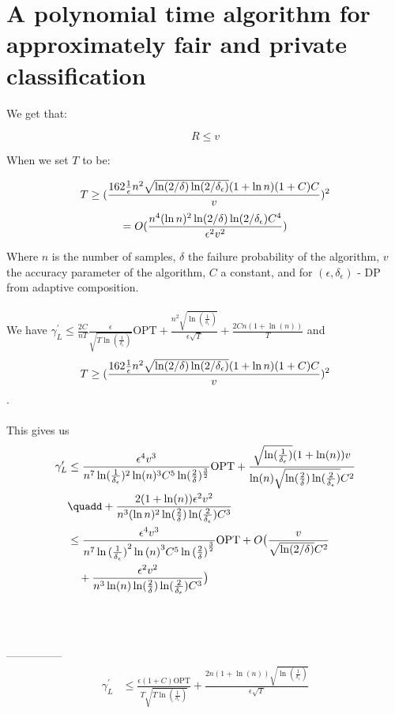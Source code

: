 
\section{A polynomial time algorithm for approximately fair and private classification}

We get that:

$$R \leq v$$

When we set $T$ to be:

$$T \geq (\frac{162\frac{1}{\epsilon}n^2 \sqrt{\ln(2/\delta) \ln(2/\delta_\epsilon)}(1+\ln n)(1+C)C}{v})^2$$
$$= O(\frac{n^4(\ln n)^2 \ln(2/\delta) \ln(2/\delta_\epsilon)C^4}{\epsilon^2 v^2})$$

Where $n$ is the number of samples, $\delta$ the failure probability of the algorithm,
$v$ the accuracy parameter of the algorithm, $C$ a constant, and for $(\epsilon, \delta_\epsilon)$ - DP from adaptive composition.
\\ \\
\newpage
We have $\gamma_L^\prime \leq \frac{2C}{nT}
\frac{\epsilon}
{\sqrt{T\ln{(
\frac{1}{\delta_{\epsilon}}
)}}} \text{OPT}
+
\frac{n^2
\sqrt{\ln{(\frac{1}{\delta_\epsilon})}}
}{\epsilon\sqrt{T}}
+
\frac{2Cn(1+\ln{(n)})}{T}$
%
%
and $$T \geq (\frac{162\frac{1}{\epsilon}n^2 \sqrt{\ln(2/\delta) \ln(2/\delta_\epsilon)}(1+\ln n)(1+C)C}{v})^2$$.
%
\\ \\
This gives us
%
\begin{align*}
    \gamma_L^\prime &\leq \frac{\epsilon^4 v^3}{ n^7 \ln(\frac{1}{\delta_\epsilon})^2 \ln(n)^3 C^5 \ln(\frac{2}{\delta})^{\frac{3}{2}} } \text{OPT}
    +
    \frac{ \sqrt{\ln(\frac{1}{\delta_\epsilon})} (1 + \ln(n)) v }
    { \ln(n) \sqrt{ \ln(\frac{2}{\delta}) \ln(\frac{2}{\delta_\epsilon})} C^2 } \\
    & \quadd +
    \frac{ 2(1 + \ln(n)) \epsilon^2 v^2 }
    { n^3 (\ln n)^2 \ln(\frac{2}{\delta}) \ln(\frac{2}{\delta_\epsilon}) C^3 }
    \\
    &\leq
    \frac{\epsilon^4 v^3}{ n^7 \ln{(\frac{1}{\delta_\epsilon})}^2 \ln{(n)}^3 C^5 \ln{(\frac{2}{\delta})}^{\frac{3}{2}} } \text{OPT}
    +
    O \big(
    \frac{v}{\sqrt{\ln(2/\delta)}C^2}
    \\
    &\quad +
    \frac{ \epsilon^2 v^2 }
    { n^3 \ln (n) \ln(\frac{2}{\delta}) \ln(\frac{2}{\delta_\epsilon}) C^3 } \big)
\end{align*}
%
%
\\ \\ \\
---------------
\begin{align*}
  \gamma_L^\prime &\leq \frac{\epsilon(1+C)\text{OPT}}
  {T\sqrt{T\ln(\frac{1}{\delta_\epsilon})}} +
  \frac{2n(1+\ln(n))\sqrt{\ln(\frac{1}{\delta_\epsilon})}}{\epsilon\sqrt{T}}
\end{align*}
\\

